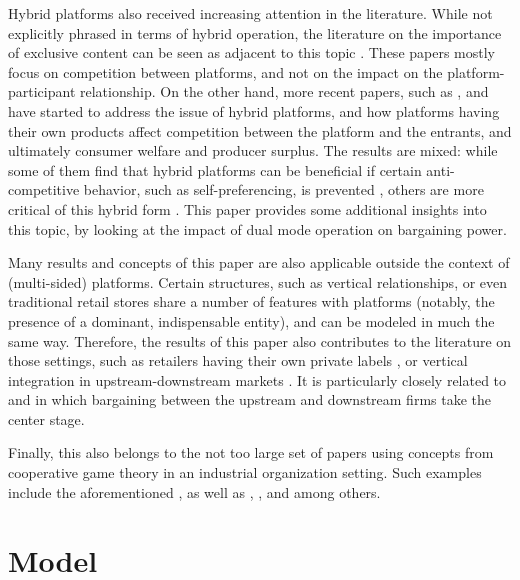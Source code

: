 \documentclass[a4paper]{article}
\begin{document}
Hybrid platforms also received increasing attention in the literature.
While not explicitly phrased in terms of hybrid operation, the literature on the importance of exclusive content can be seen as adjacent to this topic \parencite[]{hagiu2011exclusivity,lee2013vertical,dou2014sell,weeds2016tv}.
These papers mostly focus on competition between platforms, and not on the impact on the platform-participant relationship.
On the other hand, more recent papers, such as \textcite{hagiu2020should}, \textcite{anderson2021hybrid} and \textcite{gutierrez2021welfare} have started to address the issue of hybrid platforms, and how platforms having their own products affect competition between the platform and the entrants, and ultimately consumer welfare and producer surplus.
The results are mixed: while some of them find that hybrid platforms can be beneficial if certain anti-competitive behavior, such as self-preferencing, is prevented \parencite[]{anderson2021hybrid}, others are more critical of this hybrid form \parencite[]{anderson2021hybrid}.
This paper provides some additional insights into this topic, by looking at the impact of dual mode operation on bargaining power.

Many results and concepts of this paper are also applicable outside the context of (multi-sided) platforms.
Certain structures, such as vertical relationships, or even traditional retail stores share a number of features with platforms (notably, the presence of a dominant, indispensable entity), and can be modeled in much the same way.
Therefore, the results of this paper also contributes to the literature on those settings, such as retailers having their own private labels \parencite{steiner2004nature}, or vertical integration in upstream-downstream markets \parencite{hart1990vertical,aghion2006vertical}.
It is particularly closely related to \textcite{de2005vertical} and \textcite{montez2007downstream} in which bargaining between the upstream and downstream firms take the center stage.

Finally, this also belongs to the not too large set of papers using concepts from cooperative game theory in an industrial organization setting.
Such examples include the aforementioned \textcite{montez2007downstream}, as well as \textcite{hart1990property}, \textcite{levy1997individual}, \textcite{inderst2003bargaining} and \textcite{brugemann2019intra} among others.


\section{Model}
\label{sec:model}
\end{document}
